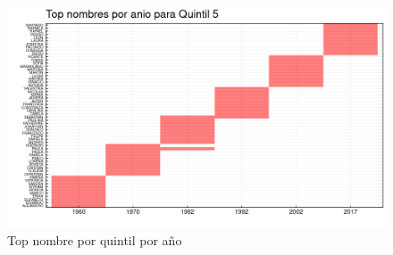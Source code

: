 \begin{landscape}
\begin{figure}[H]
\begin{center}
    \includegraphics[width=22cm]{plot/top_quintil_5.png}
    \caption{Top nombre por quintil por año}
    \label{fig:top_quintil_5}
\end{center}
\end{figure}
\end{landscape}





















\printbibliography


